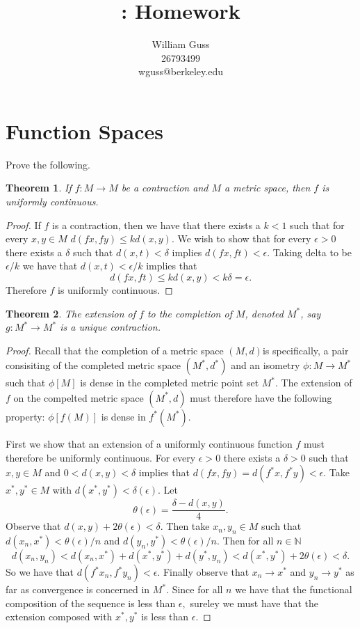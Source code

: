 \documentclass[letter]{article}
\title{\bCLASS: Homework \bHWN}
\author{William Guss\\26793499\\wguss@berkeley.edu}
\newtheorem{theorem}{Theorem}
\newenvironment{menumerate}{%
  \edef\backupindent{\the\parindent}%
  \enumerate%
  \setlength{\parindent}{\backupindent}%
}{\endenumerate}
\begin{document}
\maketitle
\thispagestyle{empty}

\setcounter{section}{3}
\section{Function Spaces}

\begin{menumerate}
\setcounter{enumi}{24}
	\item Prove the following.
	\begin{theorem}
		If $f: M \to M$ be a contraction and $M$ a metric space, then $f$ is uniformly continuous. 
	\end{theorem}
	\begin{proof}
		If $f$ is a contraction, then we have that there exists a $k < 1$ such that for every $x,y \in M$ $d(fx,fy) \leq kd(x,y).$ We wish to show that for every $\epsilon > 0$
		there exists a $\delta$ such that $d(x,t) <\delta$ implies $d(fx,ft) < \epsilon.$ Taking delta to be $\epsilon/k$ we have that $d(x,t) < \epsilon/k$ implies that $$d(fx,ft) \leq kd(x,y) < k\delta = \epsilon. $$
		Therefore $f$ is uniformly continuous.
	\end{proof}
	\begin{theorem}
		The extension of $f$ to the completion of $M$, denoted $M^*$, say $g: M^*\to M^*$ is a unique contraction.
	\end{theorem}
	\begin{proof}
		Recall that the completion of a metric space $(M,d) $is specifically, a pair consisiting of the completed metric space $(M^*,d^*)$ and an isometry $\phi: M \to M^*$ such that $\phi[M]$ is dense in the completed metric point set $M^*$. The extension of $f$ on the compelted metric space $(M^*, d)$ must therefore have the following property: $\phi[f(M)]$ is dense in $f^*(M^*)$. 

		First we show that an extension of a uniformly continuous function $f$ must therefore be uniformly continuous. For every $\epsilon > 0$ there exists a $\delta > 0$ such that $x,y \in M$ and $0< d(x,y) < \delta$ implies that $d(fx,fy) = d(f^*x,f^*y) < \epsilon.$ Take $x^*, y^* \in M$ with $d(x^*, y^*) < \delta(\epsilon).$ Let $$\theta(\epsilon) = \frac{\delta - d(x,y)}{4}.$$ Observe that $d(x,y) + 2\theta(\epsilon) < \delta.$ Then take $x_n,y_n \in M$ such that $d(x_n,x^*) < \theta(\epsilon)/n$ and $d(y_n,y^*) < \theta(\epsilon)/n.$ Then for all $n \in \mathbb{N}$
		$$d(x_n, y_n) < d(x_n, x^*) + d(x^*, y^*) + d(y^*, y_n) < d(x^*, y^*) + 2\theta(\epsilon) < \delta.$$
		So we have that $d(f^*x_n, f^*y_n) < \epsilon.$ Finally observe that $x_n \to x^*$ and $y_n \to y^*$ as far as convergence is concerned in $M^*.$ Since for all $n$ we have that the functional composition of the sequence is less than $\epsilon,$ sureley we must have that the extension composed with $x^*, y^*$ is less than $\epsilon.$


\end{proof}
\end{menumerate}
\end{document}
